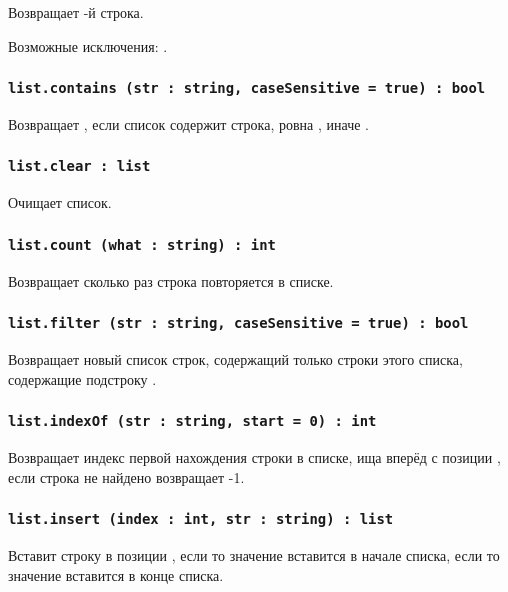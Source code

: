 Возвращает -й строка.

Возможные исключения: .

\subsubsection{\lstinline|list.contains (str : string, caseSensitive = true) : bool|}

Возвращает \true, если список содержит строка, ровна , иначе \false.

\subsubsection{\lstinline|list.clear : list|}

Очищает список.

\subsubsection{\lstinline|list.count (what : string) : int|}

Возвращает сколько раз строка  повторяется в списке.

\subsubsection{\lstinline|list.filter (str : string, caseSensitive = true) : bool|}

Возвращает новый список строк, содержащий только строки этого списка, содержащие подстроку . 

\subsubsection{\lstinline|list.indexOf (str : string, start = 0) : int|}

Возвращает индекс первой нахождения строки  в списке, ища вперёд с позиции , если строка не найдено возвращает -1.

\subsubsection{\lstinline|list.insert (index : int, str : string) : list|}

Вставит строку  в позиции , если  то значение вставится в начале списка, если  то значение вставится в конце списка.

